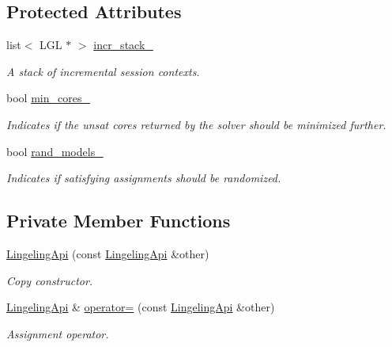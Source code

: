\subsection*{Protected Attributes}
\begin{DoxyCompactItemize}
\item 
list$<$ L\-G\-L $\ast$ $>$ \hyperlink{classLingelingApi_af9b5703f6611337668def5aaf6be465a}{incr\-\_\-stack\-\_\-}
\begin{DoxyCompactList}\small\item\em A stack of incremental session contexts. \end{DoxyCompactList}\item 
bool \hyperlink{classSatSolver_adfeecebfd09606c82b5c57cfe5aad813}{min\-\_\-cores\-\_\-}
\begin{DoxyCompactList}\small\item\em Indicates if the unsat cores returned by the solver should be minimized further. \end{DoxyCompactList}\item 
bool \hyperlink{classSatSolver_a73fed24d8fb4da85ef82dc53ac5f28c7}{rand\-\_\-models\-\_\-}
\begin{DoxyCompactList}\small\item\em Indicates if satisfying assignments should be randomized. \end{DoxyCompactList}\end{DoxyCompactItemize}
\subsection*{Private Member Functions}
\begin{DoxyCompactItemize}
\item 
\hyperlink{classLingelingApi_ac2716f603b9029e3083a1039eb1ed0bd}{Lingeling\-Api} (const \hyperlink{classLingelingApi}{Lingeling\-Api} \&other)
\begin{DoxyCompactList}\small\item\em Copy constructor. \end{DoxyCompactList}\item 
\hyperlink{classLingelingApi}{Lingeling\-Api} \& \hyperlink{classLingelingApi_a1963aa6729bd9203863010b9bbdb1683}{operator=} (const \hyperlink{classLingelingApi}{Lingeling\-Api} \&other)
\begin{DoxyCompactList}\small\item\em Assignment operator. \end{DoxyCompactList}\end{DoxyCompactItemize}



